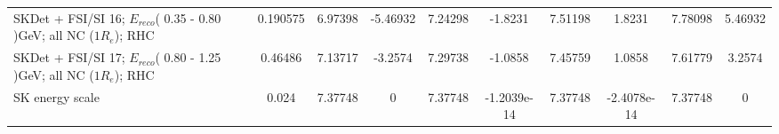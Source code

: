 \begin{tabular}{| l | S | S  S | S  S | S  S | S  S | }
         SKDet + FSI/SI 16; $E_{reco}$( 0.35 - 0.80 )GeV; all NC ($1R_{e}$); RHC &        0.190575 &         6.97398 &        -5.46932 &         7.24298 &         -1.8231 &         7.51198 &          1.8231 &         7.78098 &         5.46932 \\ 
         SKDet + FSI/SI 17; $E_{reco}$( 0.80 - 1.25 )GeV; all NC ($1R_{e}$); RHC &         0.46486 &         7.13717 &         -3.2574 &         7.29738 &         -1.0858 &         7.45759 &          1.0858 &         7.61779 &          3.2574 \\ 
                                                                 SK energy scale &           0.024 &         7.37748 &               0 &         7.37748 &     -1.2039e-14 &         7.37748 &     -2.4078e-14 &         7.37748 &               0 \\ 
\bottomrule
\end{tabular}
